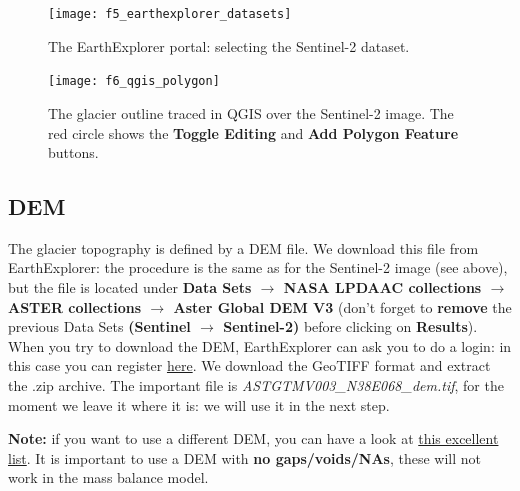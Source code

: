 \documentclass[15pt]{extarticle}
\begin{document}
\begin{figure}[hp]
    \centering
    \texttt{[image: f5\_earthexplorer\_datasets]}
    \caption{The EarthExplorer portal: selecting the Sentinel-2 dataset.}
    \label{fig:f5_earthexplorer_datasets}
\end{figure}

\begin{figure}[hp]
    \centering
    \texttt{[image: f6\_qgis\_polygon]}
    \caption{The glacier outline traced in QGIS over the Sentinel-2 image. The red circle shows the \textbf{Toggle Editing} and \textbf{Add Polygon Feature} buttons.}
    \label{fig:f6_qgis_polygon}
\end{figure}


\subsection{DEM}
\label{sect:input_dem}
The glacier topography is defined by a DEM file. We download this file from EarthExplorer: the procedure is the same as for the Sentinel-2 image (see above), but the file is located under \textbf{Data Sets $\rightarrow$ NASA LPDAAC collections $\rightarrow$ ASTER collections $\rightarrow$ Aster Global DEM V3} (don't forget to \textbf{remove} the previous Data Sets \textbf{(Sentinel $\rightarrow$ Sentinel-2)} before clicking on \textbf{Results}). When you try to download the DEM, EarthExplorer can ask you to do a login: in this case you can register \href{https://urs.earthdata.nasa.gov/users/new}{here}. We download the GeoTIFF format and extract the .zip archive. The important file is \textit{ASTGTMV003\_N38E068\_dem.tif}, for the moment we leave it where it is: we will use it in the next step.

\textbf{Note:} if you want to use a different DEM, you can have a look at \href{https://www.usna.edu/Users/oceano/pguth/md_help/html/global_dems.html}{this excellent list}. It is important to use a DEM with \textbf{no gaps/voids/NAs}, these will not work in the mass balance model.
\end{document}
